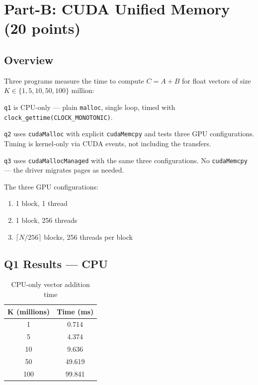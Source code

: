 \documentclass[11pt,letterpaper]{article}
\begin{document}
\section{Part-B: CUDA Unified Memory (20 points)}

\subsection{Overview}

Three programs measure the time to compute $C = A + B$ for float vectors of size
$K \in \{1, 5, 10, 50, 100\}$ million:

\texttt{q1} is CPU-only --- plain \texttt{malloc}, single loop, timed with
\texttt{clock\_gettime(CLOCK\_MONOTONIC)}.

\texttt{q2} uses \texttt{cudaMalloc} with explicit \texttt{cudaMemcpy} and tests
three GPU configurations. Timing is kernel-only via CUDA events, not including
the transfers.

\texttt{q3} uses \texttt{cudaMallocManaged} with the same three configurations.
No \texttt{cudaMemcpy} --- the driver migrates pages as needed.

The three GPU configurations:
\begin{enumerate}
  \item 1 block, 1 thread
  \item 1 block, 256 threads
  \item $\lceil N/256 \rceil$ blocks, 256 threads per block
\end{enumerate}

\subsection{Q1 Results --- CPU}

\begin{table}[H]
\centering
\caption{CPU-only vector addition time}
\begin{tabular}{cc}
\toprule
\textbf{K (millions)} & \textbf{Time (ms)} \\
\midrule
1   & 0.714  \\
5   & 4.374  \\
10  & 9.636  \\
50  & 49.619 \\
100 & 99.841 \\
\bottomrule
\end{tabular}
\end{table}
\end{document}
